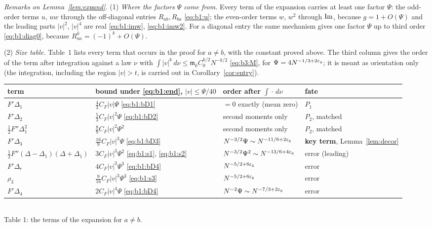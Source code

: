 \noindent\emph{Remarks on Lemma~\ref{lem:expand}.}
(1) \emph{Where the factors $\Psi$ come from.} Every term of the expansion carries at least one factor $\Psi$: the odd-order terms $u$, $uw$ through the
off-diagonal entries $R_{ab},R_{ba}$ \eqref{eq:b1:u}; the even-order terms $w$, $w^2$ through $\operatorname{Im}$, because $g=1+O(\Psi)$ and the leading parts
$|v|^2$, $|v|^4$ are real \eqref{eq:b1:imw}, \eqref{eq:b1:imw2}. For a diagonal entry the same mechanism gives one factor $\Psi$ up to third order \eqref{eq:b1:diag0},
because $R_{aa}^k=(-1)^k+O(\Psi)$.

(2) \emph{Size table.} Table~1 lists every term that occurs in the proof for $a\ne b$, with the constant proved above. The third column gives the order of the
term after integration against a law $\nu$ with $\int|v|^k\,d\nu\le\mathfrak m_kC_0^{k/2}N^{-k/2}$ \eqref{eq:b3:M}, for $\Psi=4N^{-1/3+2\varepsilon_{\mathrm g}}$; it is meant as orientation only
(the integration, including the region $|v|>t$, is carried out in Corollary~\ref{cor:entry}).

\begin{center}\footnotesize
\begin{tabular}{l|l|l|l}
term & bound under \eqref{eq:b1:end}, $|v|\le\Psi/40$ & order after $\int\!\cdot\,d\nu$ & fate\\\hline
$F'\Delta_1$ & $\frac43C_F|v|\Psi$ \eqref{eq:b1:bD1} & $=0$ exactly (mean zero) & $P_1$\\[1pt]
$F'\Delta_2$ & $\frac53C_F|v|^2\Psi$ \eqref{eq:b1:bD2} & second moments only & $P_2$, matched\\[1pt]
$\frac12F''\Delta_1^2$ & $\frac89C_F|v|^2\Psi^2$ & second moments only & $P_2$, matched\\[1pt]
$F'\Delta_3$ & $\frac{16}9C_F|v|^3\Psi$ \eqref{eq:b1:bD3} & $N^{-3/2}\Psi\sim N^{-11/6+2\varepsilon_{\mathrm g}}$ & \textbf{key term}, Lemma~\ref{lem:decor}\\[1pt]
$\frac12F''(\Delta-\Delta_1)(\Delta+\Delta_1)$ & $3C_F|v|^3\Psi^2$ \eqref{eq:b1:s1}, \eqref{eq:b1:s2} & $N^{-3/2}\Psi^2\sim N^{-13/6+4\varepsilon_{\mathrm g}}$ & error (leading)\\[1pt]
$F'\Delta_r$ & $4C_F|v|^3\Psi^3$ \eqref{eq:b1:bD4} & $N^{-5/2+6\varepsilon_{\mathrm g}}$ & error\\[1pt]
$\rho_3$ & $\frac9{16}C_F|v|^3\Psi^3$ \eqref{eq:b1:s3} & $N^{-5/2+6\varepsilon_{\mathrm g}}$ & error\\[1pt]
$F'\Delta_4$ & $2C_F|v|^4\Psi$ \eqref{eq:b1:bD4} & $N^{-2}\Psi\sim N^{-7/3+2\varepsilon_{\mathrm g}}$ & error
\end{tabular}\\[3pt]
Table 1: the terms of the expansion for $a\ne b$.
\end{center}


